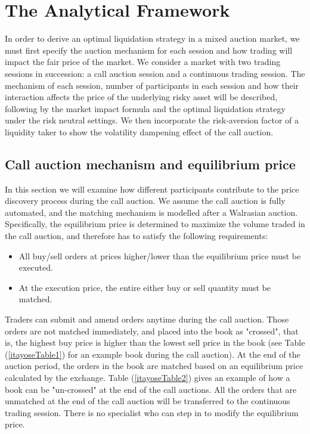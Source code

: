 \section{The Analytical Framework}\label{sec:AnalyticalFramework}

In order to derive an optimal liquidation strategy in a mixed auction market, we must first specify the auction mechanism for each session and how trading will impact the fair price of the market. We consider a market with two trading sessions in succession: a call auction session and a continuous trading session. The mechanism of each session, number of participants in each session and how their interaction affects the price of the underlying risky asset will be described, following by the market impact formula and the optimal liquidation strategy {\color{red} under the risk neutral settings. We then incorporate the risk-aversion factor of a liquidity taker to show the volatility dampening effect of the call auction.}

\subsection{Call auction mechanism and equilibrium price}\label{subsec:AnalyticalFrameworkCallAuction}

In this section we will examine how different participants contribute to the price discovery process during the call auction. We assume the call auction is fully automated, and the matching mechanism is modelled after a Walrasian auction. Specifically, the equilibrium price is determined to maximize the volume traded in the call auction, and therefore has to satisfy the following requirements:

\begin{itemize}
  \item All buy/sell orders at prices higher/lower than the equilibrium price must be executed.
  \item At the execution price, the entire either buy or sell quantity must be matched.
\end{itemize}

Traders can submit and amend orders anytime during the call auction. Those orders are not matched immediately, and placed into the book as "crossed", that is, the highest buy price is higher than the lowest sell price in the book (see Table (\ref{itayoseTable1}) for an example book during the call auction). At the end of the auction period, the orders in the book are matched based on an equilibrium price calculated by the exchange. Table (\ref{itayoseTable2}) gives an example of how a book can be "un-crossed" at the end of the call auctions. All the orders that are unmatched at the end of the call auction will be transferred to the continuous trading session. There is no specialist who can step in to modify the equilibrium price.

